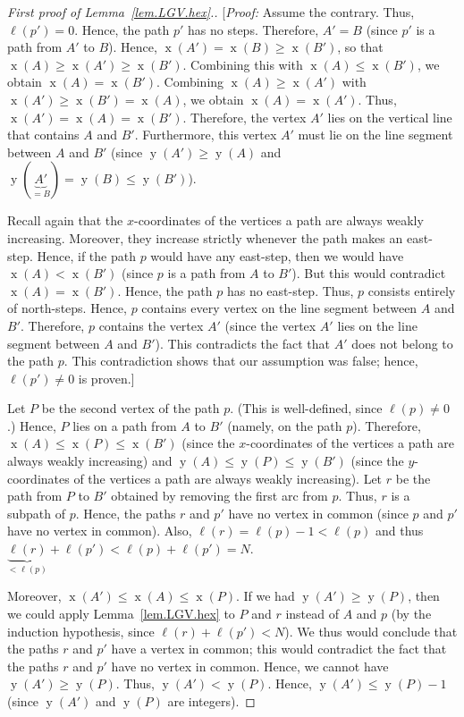 \documentclass[reqno]{amsart}
\newcommand{\0}{\phantom{c}}
\DeclareMathOperator{\xcoord}{x} %
\DeclareMathOperator{\ycoord}{y} %
\newenvironment{verlong}{}{}
\theoremstyle{plain}
\theoremstyle{definition}
\numberwithin{equation}{section}
\begin{document}
\begin{verlong}
\begin{proof}[First proof of Lemma~\ref{lem.LGV.hex}.]
[\textit{Proof:}
Assume the contrary. Thus, $\ell(p') = 0$.
Hence, the path $p'$ has no steps.
Therefore, $A'=B$ (since $p'$ is a path from $A'$ to $B$).
Hence, $\xcoord(A') = \xcoord(B) \geq \xcoord(B')$, so that $\xcoord(A) \geq \xcoord(A') \geq \xcoord (B')$.
Combining this with $\xcoord(A) \leq \xcoord(B')$, we obtain $\xcoord(A) = \xcoord(B')$.
Combining $\xcoord(A) \geq \xcoord(A')$ with $\xcoord(A') \geq \xcoord(B') = \xcoord(A)$, we obtain $\xcoord(A)  = \xcoord(A')$.
Thus, $\xcoord(A') = \xcoord(A) = \xcoord(B')$.
Therefore, the vertex $A'$ lies on the vertical line that contains $A$ and $B'$.
Furthermore, this vertex $A'$ must lie on the line segment between $A$ and $B'$ (since $\ycoord(A') \geq \ycoord(A)$ and $\ycoord(\underbrace{A'}_{=B}) = \ycoord(B) \leq \ycoord(B')$).

Recall again that the $x$-coordinates of the vertices a path are always weakly increasing.
Moreover, they increase strictly whenever the path makes an east-step.
Hence, if the path $p$ would have any east-step, then we would have $\xcoord(A) < \xcoord(B')$ (since $p$ is a path from $A$ to $B'$).
But this would contradict $\xcoord(A) = \xcoord(B')$.
Hence, the path $p$ has no east-step.
Thus, $p$ consists entirely of north-steps.
Hence, $p$ contains every vertex on the line segment between $A$ and $B'$.
Therefore, $p$ contains the vertex $A'$ (since the vertex $A'$ lies on the line segment between $A$ and $B'$).
This contradicts the fact that $A'$ does not belong to the path $p$.
This contradiction shows that our assumption was false; hence, $\ell(p') \neq 0$ is proven.]

Let $P$ be the second vertex of the path $p$.
(This is well-defined, since $\ell(p) \neq 0$.)
Hence, $P$ lies on a path from $A$ to $B'$ (namely, on the path $p$).
Therefore, $\xcoord(A) \leq \xcoord(P) \leq \xcoord(B')$ (since the $x$-coordinates of the vertices a path are
always weakly increasing) and $\ycoord(A) \leq \ycoord(P) \leq \ycoord(B')$ (since the $y$-coordinates of the vertices a path are always weakly increasing).
Let $r$ be the path from $P$ to $B'$ obtained by removing the first arc from $p$.
Thus, $r$ is a subpath of $p$.
Hence, the paths $r$ and $p'$ have no vertex in common (since $p$ and $p'$ have no vertex in common).
Also, $\ell(r) = \ell(p) - 1 < \ell(p)$ and thus $\underbrace{\ell(r)}_{<\ell(p)} + \ell(p') < \ell(p) + \ell(p') = N$.

Moreover, $\xcoord(A') \leq \xcoord(A) \leq \xcoord(P)$.
If we had $\ycoord(A') \geq \ycoord(P)$, then we could apply Lemma~\ref{lem.LGV.hex} to $P$ and $r$ instead of $A$ and $p$ (by the induction hypothesis, since $\ell(r) + \ell(p') < N$).
We thus would conclude that the paths $r$ and $p'$ have a vertex in common; this would contradict the fact that the paths $r$ and $p'$ have no vertex in common.
Hence, we cannot have $\ycoord(A') \geq \ycoord(P)$.
Thus, $\ycoord(A') < \ycoord(P)$.
Hence, $\ycoord(A') \leq \ycoord(P)  -1$ (since $\ycoord(A')$ and $\ycoord(P)$ are integers).


\end{proof}
\end{verlong}
\end{document}
